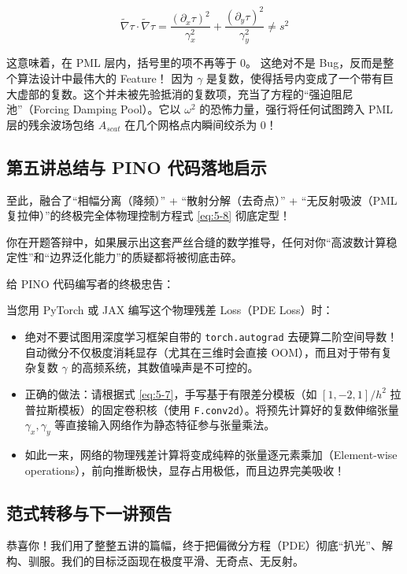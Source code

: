 \documentclass[12pt]{article}
\begin{document}
{\begin{equation}
\tilde{\nabla} \tau \cdot \tilde{\nabla} \tau
=
\frac{(\partial_x \tau)^2}{\gamma_x^2}
+
\frac{(\partial_y \tau)^2}{\gamma_y^2}
\neq s^2
\label{eq:5-gradtau-pml}
\end{equation}

这意味着，在 PML 层内，括号里的项不再等于 0。
这绝对不是 Bug，反而是整个算法设计中最伟大的 Feature！
因为 $\gamma$ 是复数，使得括号内变成了一个带有巨大虚部的复数。这个并未被先验抵消的复数项，充当了方程的“强迫阻尼池”（Forcing Damping Pool）。它以 $\omega^2$ 的恐怖力量，强行将任何试图跨入 PML 层的残余波场包络 $A_{scat}$ 在几个网格点内瞬间绞杀为 0！

\subsection{第五讲总结与 PINO 代码落地启示}

至此，融合了“相幅分离（降频）” + “散射分解（去奇点）” + “无反射吸波（PML复拉伸）”的终极完全体物理控制方程式 \eqref{eq:5-8} 彻底定型！

你在开题答辩中，如果展示出这套严丝合缝的数学推导，任何对你“高波数计算稳定性”和“边界泛化能力”的质疑都将被彻底击碎。

给 PINO 代码编写者的终极忠告：

当您用 PyTorch 或 JAX 编写这个物理残差 Loss（PDE Loss）时：

\begin{itemize}[leftmargin=2em]
    \item 绝对不要试图用深度学习框架自带的 \texttt{torch.autograd} 去硬算二阶空间导数！自动微分不仅极度消耗显存（尤其在三维时会直接 OOM），而且对于带有复杂复数 $\gamma$ 的高频系统，其数值噪声是不可控的。
    \item 正确的做法：请根据式 \eqref{eq:5-7}，手写基于有限差分模板（如 $[1, -2, 1]/h^2$ 拉普拉斯模板）的固定卷积核（使用 \texttt{F.conv2d}）。将预先计算好的复数伸缩张量 $\gamma_x, \gamma_y$ 等直接输入网络作为静态特征参与张量乘法。
    \item 如此一来，网络的物理残差计算将变成纯粹的张量逐元素乘加（Element-wise operations），前向推断极快，显存占用极低，而且边界完美吸收！
\end{itemize}

\subsection{范式转移与下一讲预告}

恭喜你！我们用了整整五讲的篇幅，终于把偏微分方程（PDE）彻底“扒光”、解构、驯服。我们的目标泛函现在极度平滑、无奇点、无反射。

}
\end{document}
